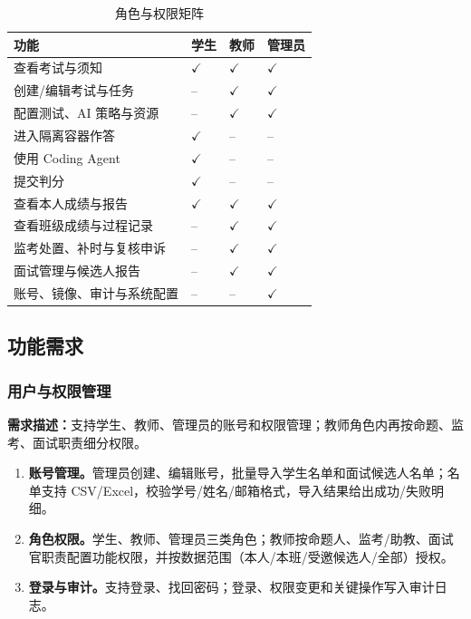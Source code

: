 \documentclass[UTF8,12pt,a4paper]{ctexart}
\begin{document}
\begin{table}[H]
\centering
\caption{角色与权限矩阵}
\label{tab:permissions}
\small
\begin{tabularx}{\textwidth}{|Y|p{1.6cm}|p{2.2cm}|p{1.8cm}|}
\hline
\textbf{功能} & \textbf{学生} & \textbf{教师} & \textbf{管理员} \\ \hline
查看考试与须知 & $\checkmark$ & $\checkmark$ & $\checkmark$ \\ \hline
创建/编辑考试与任务 & -- & $\checkmark$ & $\checkmark$ \\ \hline
配置测试、AI 策略与资源 & -- & $\checkmark$ & $\checkmark$ \\ \hline
进入隔离容器作答 & $\checkmark$ & -- & -- \\ \hline
使用 Coding Agent & $\checkmark$ & -- & -- \\ \hline
提交判分 & $\checkmark$ & -- & -- \\ \hline
查看本人成绩与报告 & $\checkmark$ & $\checkmark$ & $\checkmark$ \\ \hline
查看班级成绩与过程记录 & -- & $\checkmark$ & $\checkmark$ \\ \hline
监考处置、补时与复核申诉 & -- & $\checkmark$ & $\checkmark$ \\ \hline
面试管理与候选人报告 & -- & $\checkmark$ & $\checkmark$ \\ \hline
账号、镜像、审计与系统配置 & -- & -- & $\checkmark$ \\ \hline
\end{tabularx}
\end{table}

\subsection{功能需求}

\subsubsection{用户与权限管理}

\textbf{需求描述：}支持学生、教师、管理员的账号和权限管理；教师角色内再按命题、监考、面试职责细分权限。

\begin{enumerate}[leftmargin=2em,itemsep=2pt]
  \item \textbf{账号管理。}管理员创建、编辑账号，批量导入学生名单和面试候选人名单；名单支持 CSV/Excel，校验学号/姓名/邮箱格式，导入结果给出成功/失败明细。
  \item \textbf{角色权限。}学生、教师、管理员三类角色；教师按命题人、监考/助教、面试官职责配置功能权限，并按数据范围（本人/本班/受邀候选人/全部）授权。
  \item \textbf{登录与审计。}支持登录、找回密码；登录、权限变更和关键操作写入审计日志。
\end{enumerate}
\end{document}

